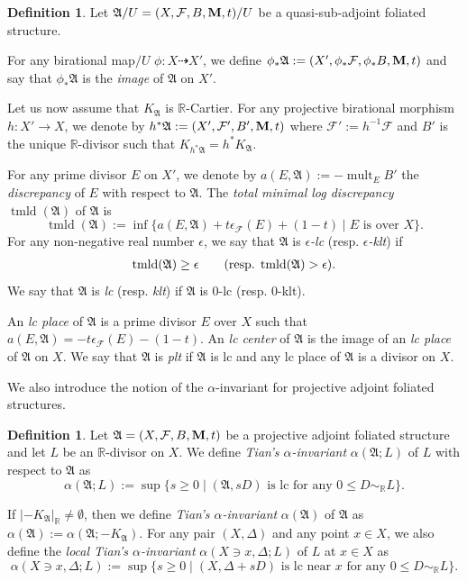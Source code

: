 \documentclass[11pt,reqno]{amsart}
\numberwithin{equation}{section}
\newcommand{\Mm}{{\bf{M}}}
\newcommand{\Rr}{\mathbb{R}}
\newcommand{\tmld}{{\operatorname{tmld}}}
\newcommand{\mult}{\operatorname{mult}}
\newcommand{\Aa}{{\mathfrak{A}}}
\newcommand{\Ff}{\mathcal{F}}
\theoremstyle{definition}
\newtheorem{defn}[thm]{Definition}
\begin{document}
\begin{defn}\label{defn: sing of afs}
Let $\Aa/U=(X,\Ff,B,\Mm,t)/U$ be a quasi-sub-adjoint foliated structure.

For any birational map$/U$ $\phi\colon X\dashrightarrow X'$, we define $\phi_*\Aa:=(X',\phi_*\Ff,\phi_*B,\Mm,t)$ and say that $\phi_*\Aa$ is the \emph{image} of $\Aa$ on $X'$. 

Let us now assume that $K_{\Aa}$ is $\mathbb R$-Cartier. For any projective birational morphism $h\colon X'\rightarrow X$, we denote by
$h^*\Aa:=(X',\Ff',B',\Mm,t)$ where $\Ff':=h^{-1}\Ff$ and $B'$ is the unique $\Rr$-divisor such that $K_{h^*\Aa}=h^*K_{\Aa}$. 

For any prime divisor $E$ on $X'$, we denote by
$a(E,\Aa):=-\mult_EB'$
the \emph{discrepancy} of $E$ with respect to $\Aa$. 
The \emph{total minimal log discrepancy} $\tmld(\Aa)$ of $\Aa$ is
\[\tmld(\Aa):=\inf\{a(E,\Aa)+t\epsilon_{\Ff}(E)+(1-t)\mid E\text{ is over }X\}.\]
For any non-negative real number $\epsilon$, we say that $\Aa$ is \emph{$\epsilon$-lc} (resp. \emph{$\epsilon$-klt}) if 
\begin{align*}
    \tmld(\Aa)\geq\epsilon \qquad 
    \text{(resp. $ \tmld(\Aa)>\epsilon$)}.
\end{align*}
We say that $\Aa$ is \emph{lc} (resp. \emph{klt}) if $\Aa$ is $0$-lc (resp. $0$-klt). 

An \emph{lc place} of $\Aa$ is a prime divisor $E$ over $X$ such that $a(E,\Aa)=-t\epsilon_{\Ff}(E)-(1-t)$. An \emph{lc center} of $\Aa$ is the image of an \emph{lc place} of $\Aa$ on $X$. We say that $\Aa$ is \emph{plt} if $\Aa$ is lc and any lc place of $\Aa$ is a divisor on $X$.
\end{defn}

We also introduce the notion of the $\alpha$-invariant for projective adjoint foliated structures.

\begin{defn}\label{defn: alpha}
    Let $\Aa=(X,\Ff,B,\Mm,t)$ be a projective adjoint foliated structure and let $L$ be an $\mathbb R$-divisor on $X$. We define \emph{Tian's $\alpha$-invariant}
    $\alpha(\Aa;L)$ of $L$ with respect to $\Aa$ as
    \[\alpha(\Aa;L):=\sup\{s\geq 0\mid (\Aa,sD)\text{ is lc for any }0\leq D\sim_{\mathbb R}L\}.\]

If $|-K_{\Aa}|_{\mathbb R}\neq\emptyset$, then we define 
\emph{Tian's $\alpha$-invariant} 
$\alpha(\Aa)$ of $\Aa$ as $\alpha(\Aa):=\alpha(\Aa;-K_{\Aa})$. For any pair $(X,\Delta)$ and any point $x \in X$, we also define the \emph{local Tian's $\alpha$-invariant} 
  $\alpha(X\ni x,\Delta;L)$ of $L$ at $x \in X$
  as
    \[\alpha(X\ni x,\Delta;L):=\sup\{s\geq 0\mid (X,\Delta+sD)\text{ is lc near }x\text{ for any }0\leq D\sim_{\mathbb R}L\}.\]
\end{defn}
\end{document}
